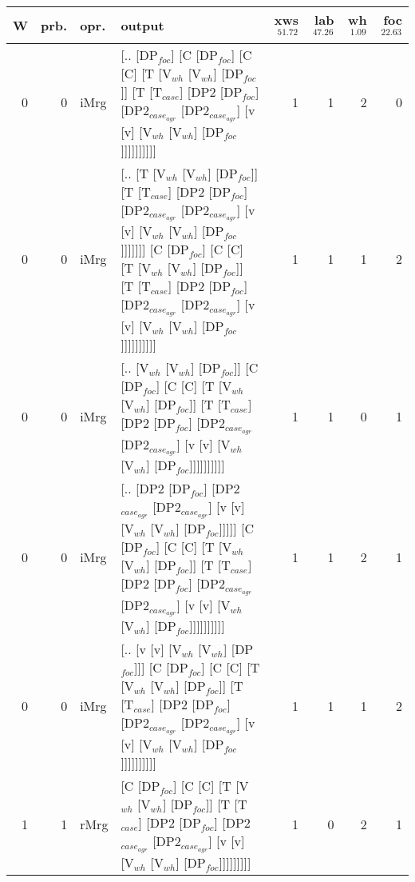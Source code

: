 \begin{tabularx}{\linewidth}{rrlXrrrr}
\hline
   W &   prb. & opr.   & output                                                                                                                                                                                                                                                            &   xws$^{51.72}$ &   lab$^{47.26}$ &   wh$^{1.09}$ &   foc$^{22.63}$ \\
\hline
   0 &   0 & iMrg & [.. [DP$_{foc}$] [C [DP$_{foc}$] [C [C] [T [V$_{wh}$ [V$_{wh}$] [DP$_{foc}$]] [T [T$_{case}$] [DP2 [DP$_{foc}$] [DP2$_{case_{agr}}$ [DP2$_{case_{agr}}$] [v [v] [V$_{wh}$ [V$_{wh}$] [DP$_{foc}$]]]]]]]]]]                                                                                                            &             1 &             1 &            2 &             0 \\
   0 &   0 & iMrg & [.. [T [V$_{wh}$ [V$_{wh}$] [DP$_{foc}$]] [T [T$_{case}$] [DP2 [DP$_{foc}$] [DP2$_{case_{agr}}$ [DP2$_{case_{agr}}$] [v [v] [V$_{wh}$ [V$_{wh}$] [DP$_{foc}$]]]]]]] [C [DP$_{foc}$] [C [C] [T [V$_{wh}$ [V$_{wh}$] [DP$_{foc}$]] [T [T$_{case}$] [DP2 [DP$_{foc}$] [DP2$_{case_{agr}}$ [DP2$_{case_{agr}}$] [v [v] [V$_{wh}$ [V$_{wh}$] [DP$_{foc}$]]]]]]]]]] &             1 &             1 &            1 &             2 \\
   0 &   0 & iMrg & [.. [V$_{wh}$ [V$_{wh}$] [DP$_{foc}$]] [C [DP$_{foc}$] [C [C] [T [V$_{wh}$ [V$_{wh}$] [DP$_{foc}$]] [T [T$_{case}$] [DP2 [DP$_{foc}$] [DP2$_{case_{agr}}$ [DP2$_{case_{agr}}$] [v [v] [V$_{wh}$ [V$_{wh}$] [DP$_{foc}$]]]]]]]]]]                                                                                              &             1 &             1 &            0 &             1 \\
   0 &   0 & iMrg & [.. [DP2 [DP$_{foc}$] [DP2$_{case_{agr}}$ [DP2$_{case_{agr}}$] [v [v] [V$_{wh}$ [V$_{wh}$] [DP$_{foc}$]]]]] [C [DP$_{foc}$] [C [C] [T [V$_{wh}$ [V$_{wh}$] [DP$_{foc}$]] [T [T$_{case}$] [DP2 [DP$_{foc}$] [DP2$_{case_{agr}}$ [DP2$_{case_{agr}}$] [v [v] [V$_{wh}$ [V$_{wh}$] [DP$_{foc}$]]]]]]]]]]                                         &             1 &             1 &            2 &             1 \\
   0 &   0 & iMrg & [.. [v [v] [V$_{wh}$ [V$_{wh}$] [DP$_{foc}$]]] [C [DP$_{foc}$] [C [C] [T [V$_{wh}$ [V$_{wh}$] [DP$_{foc}$]] [T [T$_{case}$] [DP2 [DP$_{foc}$] [DP2$_{case_{agr}}$ [DP2$_{case_{agr}}$] [v [v] [V$_{wh}$ [V$_{wh}$] [DP$_{foc}$]]]]]]]]]]                                                                                      &             1 &             1 &            1 &             2 \\
   1 &   1 & rMrg & [C [DP$_{foc}$] [C [C] [T [V$_{wh}$ [V$_{wh}$] [DP$_{foc}$]] [T [T$_{case}$] [DP2 [DP$_{foc}$] [DP2$_{case_{agr}}$ [DP2$_{case_{agr}}$] [v [v] [V$_{wh}$ [V$_{wh}$] [DP$_{foc}$]]]]]]]]]                                                                                                                          &             1 &             0 &            2 &             1 \\
\hline
\end{tabularx}\endgroup\\
